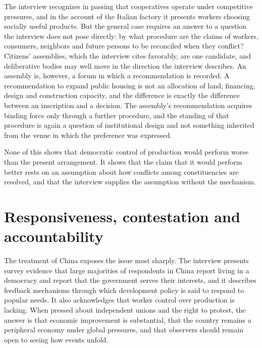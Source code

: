 \documentclass[12pt]{article}
\theoremstyle{definition}
\begin{document}
The interview recognizes in passing that cooperatives operate under competitive pressures, and in the account of the Italian factory it presents workers choosing socially useful products. But the general case requires an answer to a question the interview does not pose directly: by what procedure are the claims of workers, consumers, neighbors and future persons to be reconciled when they conflict? Citizens' assemblies, which the interview cites favorably, are one candidate, and deliberative bodies may well move in the direction the interview describes. An assembly is, however, a forum in which a recommendation is recorded. A recommendation to expand public housing is not an allocation of land, financing, design and construction capacity, and the difference is exactly the difference between an inscription and a decision. The assembly's recommendation acquires binding force only through a further procedure, and the standing of that procedure is again a question of institutional design and not something inherited from the venue in which the preference was expressed.

None of this shows that democratic control of production would perform worse than the present arrangement. It shows that the claim that it would perform better rests on an assumption about how conflicts among constituencies are resolved, and that the interview supplies the assumption without the mechanism.

\section{Responsiveness, contestation and accountability}

The treatment of China exposes the issue most sharply. The interview presents survey evidence that large majorities of respondents in China report living in a democracy and report that the government serves their interests, and it describes feedback mechanisms through which development policy is said to respond to popular needs. It also acknowledges that worker control over production is lacking. When pressed about independent unions and the right to protest, the answer is that economic improvement is substantial, that the country remains a peripheral economy under global pressures, and that observers should remain open to seeing how events unfold.
\end{document}
